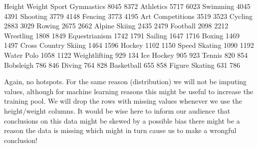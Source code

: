 \documentclass[letterpaper,10pt,english]{jupyterBook}
\begin{document}
\begin{sphinxVerbatim}[commandchars=\\\{\}]
\PYG{p}{[}\PYG{p}{[} \PYG{p}{]}\PYG{p}{]}   
\end{sphinxVerbatim}

\begin{sphinxVerbatim}[commandchars=\\\{\}]
                      Height  Weight
Sport                               
Gymnastics              8045    8372
Athletics               5717    6023
Swimming                4045    4391
Shooting                3779    4148
Fencing                 3773    4195
Art Competitions        3519    3523
Cycling                 2883    3029
Rowing                  2675    2662
Alpine Skiing           2435    2479
Football                2098    2212
Wrestling               1808    1849
Equestrianism           1742    1791
Sailing                 1647    1716
Boxing                  1469    1497
Cross Country Skiing    1464    1596
Hockey                  1102    1150
Speed Skating           1090    1192
Water Polo              1058    1122
Weightlifting            929     134
Ice Hockey               905     923
Tennis                   820     854
Bobsleigh                786     846
Diving                   764     828
Basketball               655     858
Figure Skating           631     786
\end{sphinxVerbatim}

\sphinxAtStartPar
Again, no hotspots. For the same reason (distribution) we will not be imputing values, although for machine learning reasons this might be useful to increase the training pool. We will drop the rows with missing values whenever we use the height/weight columns. It would be wise here to inform our audience that conclusions on this data might be skewed by a possible bias \sphinxhyphen{} there might be a reason the data is missing \sphinxhyphen{} which might in turn cause us to make a wrongful conclusion!
\end{document}
